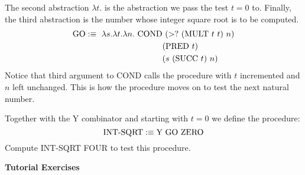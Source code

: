 \documentclass[11pt]{report}
\begin{document}
\begin{itemize}
	The second abstraction $\lambda t.$ is the abstraction we pass the test $t=0$ to. Finally, the third abstraction is the number whose integer square root is to be computed. 
	\begin{align*}
		\GO:\equiv \  \lambda s. \lambda t. \lambda n. \ \COND &\ (>? \ (\MULT \ t \ t) \ n) \\
		&(\PRED \ t) \\
		&(s \ (\SUCC \ t) \ n)
	\end{align*}
	Notice that third argument to COND calls the procedure with $t$ incremented and $n$ left unchanged. This is how the procedure moves on to test the next natural number. 

	Together with the Y combinator and starting with $t=0$ we define the procedure: 
	$$\text{INT-SQRT} :\equiv \text{Y} \ \text{GO} \ \text{ZERO}$$
	Compute INT-SQRT FOUR to test this procedure. 



\end{itemize}

\newpage
{\bf Tutorial Exercises}
\end{document}
